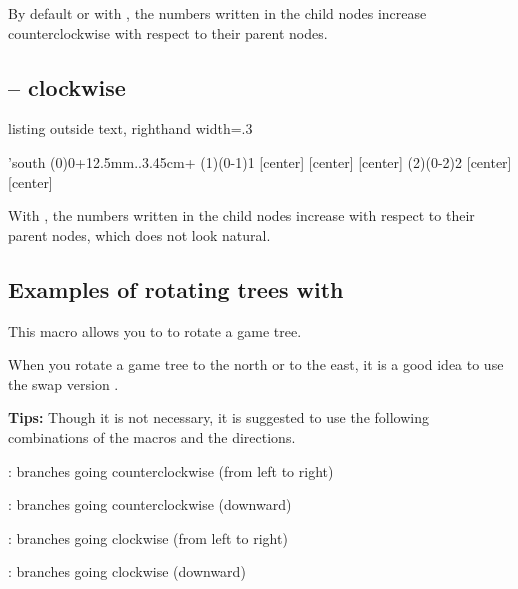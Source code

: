 By default or with , the numbers written in the child nodes increase counterclockwise with respect to their parent nodes.

\subsection{\protect{} -- clockwise}

\begin{tcblisting}{listing outside text, righthand width=.3\linewidth}
\begin{istgame}
\setistgrowdirection'{south}
\setistOvalNodeStyle{.6cm}
\istrooto(0){0}+{12.5mm}..{3.45cm}+
  \istb  \istb  \endist
\xtdistance{12.5mm}{11.5mm}
\istrooto(1)(0-1){1}
  [center]  [center]
  [center]  \endist
\istrooto(2)(0-2){2}
  [center]  [center]  \endist
\end{istgame}
\end{tcblisting}

With , the numbers written in the child nodes increase  with respect to their parent nodes, which does not look natural.

\subsection{Examples of rotating trees with \protect\cmd{\setistgrowdirection}}

This macro allows you to to rotate a game tree.

When you rotate a game tree to the north or to the east, it is a good idea to use the swap version .



\noindent\textbf{Tips:} \label{page:growtips}
Though it is not necessary, it is suggested to use the following combinations of the macros and the directions.

: branches going counterclockwise (from left to right)\par
{}: branches going counterclockwise (downward)\par
{}: branches going clockwise (from left to right)\par
{}: branches going clockwise (downward)

